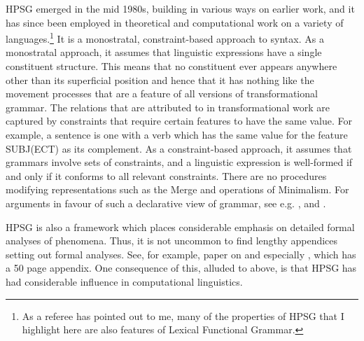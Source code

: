 \documentclass[output=paper]{langsci/langscibook}
\begin{document}
\gls{HPSG} emerged in the mid 1980s, building in various ways on earlier work,
and it has since been employed in theoretical and computational work on a
variety of languages.\footnote{As a referee has pointed out to me, many of the
    properties of \gls{HPSG} that I highlight here are also features of Lexical
Functional Grammar.} It is a monostratal, constraint-based approach to syntax.
As a monostratal approach, it assumes that linguistic expressions have a single
constituent structure. This means that no constituent ever appears anywhere
other than its superficial position and hence that it has nothing like the
movement processes that are a feature of all versions of transformational
grammar. The relations that are attributed to  in transformational work
are captured by constraints that require certain features to have the same
value. For example, a  sentence is one with a verb which has the same
value for the feature SUBJ(ECT) as its complement. As a constraint-based
approach, it assumes that grammars involve sets of constraints, and a
linguistic expression is well-formed if and only if it conforms to all relevant
constraints. There are no procedures modifying representations such as the
Merge and  operations of Minimalism. For arguments in favour of such a
declarative view of grammar, see e.g. \citet{PulScho2001}, \citet{Postal2003}
and \textcite{SagWas2011,SagWas2015}.

\gls{HPSG} is also a framework which places considerable emphasis on detailed
formal analyses of phenomena. Thus, it is not uncommon to find lengthy
appendices setting out formal analyses. See, for example, 
paper on   and especially \citet{GinSag2000}, which has
a 50 page appendix. One consequence of this, alluded to above, is that
\gls{HPSG} has had considerable influence in computational linguistics.
\end{document}
